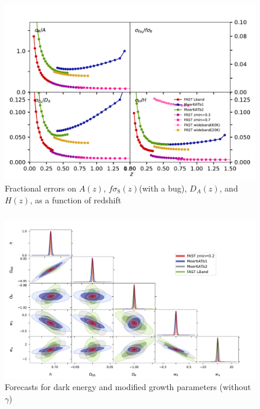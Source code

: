 \documentclass[UTF8]{beamer}
\begin{document}
    \begin{frame}
        \frametitle{}
        \begin{figure}
            \centering
            \includegraphics[scale=0.4]{fig06-zfns.pdf}
            \caption{Fractional errors on $A(z)$, $f\sigma_8(z)$(with a bug), $D_A(z)$, and $H(z)$, as a function of redshift}
        \end{figure}
    \end{frame}

    \begin{frame}
        \frametitle{}
        \begin{figure}
            \centering
            \includegraphics[scale=0.27]{fig17-6params-eos.pdf}
            \caption{Forecasts for dark energy and modified growth parameters (without $\gamma$)}
        \end{figure}
    \end{frame}
\end{document}
